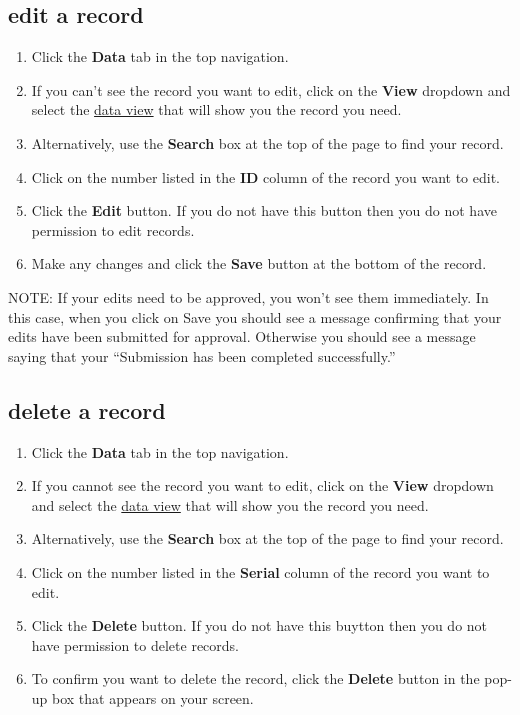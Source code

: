 \documentclass{ctrlo-int-toc}
\begin{document}
\subsection[edit a record]{edit a record}
\label{subsec:editrecord}
\begin{enumerate}
\item Click the \textbf{Data} tab in the top navigation.
\item If you can't see the record you want to edit, click on the \textbf{View} dropdown and select the \hyperref[sec:views]{data view} that will show you the record you need.
\item Alternatively, use the \textbf{Search} box at the top of the page to find your record.
\item Click on the number listed in the \textbf{ID} column of the record you want to edit.
\item Click the \textbf{Edit} button. If you do not have this button then you do not have permission to edit records.
\item Make any changes and click the \textbf{Save} button at the bottom of the record.
\end{enumerate}
\begin{notebox}
NOTE: If your edits need to be approved, you won't see them immediately. In this case, when you click on Save you should see a message confirming that your edits have been submitted for approval. Otherwise you should see a message saying that your ``Submission has been completed successfully.''
\end{notebox}

\subsection[delete a record]{delete a record}
\begin{enumerate}
\item Click the \textbf{Data} tab in the top navigation.
\item If you cannot see the record you want to edit, click on the \textbf{View} dropdown and select the \hyperref[sec:views]{data view} that will show you the record you need.
\item Alternatively, use the \textbf{Search} box at the top of the page to find your record.
\item Click on the number listed in the \textbf{Serial} column of the record you want to edit.
\item Click the \textbf{Delete} button. If you do not have this buytton then you do not have permission to delete records.
\item To confirm you want to delete the record, click the \textbf{Delete} button in the pop-up box that appears on your screen. 
\end{enumerate}
\end{document}
